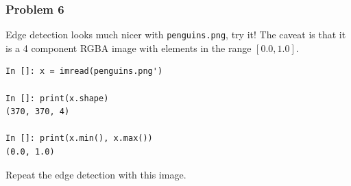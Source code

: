 \documentclass[14pt,compress]{beamer}
\newcommand{\typ}[1]{\lstinline{#1}}
\begin{document}
\begin{frame}[fragile]
  \frametitle{Problem 6}

  Edge detection looks much nicer with \typ{penguins.png}, try it!  The
  caveat is that it is a 4 component RGBA image with elements in the
  range $[0.0, 1.0]$.

\begin{lstlisting}
In []: x = imread(penguins.png')

In []: print(x.shape)
(370, 370, 4)

In []: print(x.min(), x.max())
(0.0, 1.0)
\end{lstlisting}

 Repeat the edge detection with this image.

\end{frame}
\end{document}
